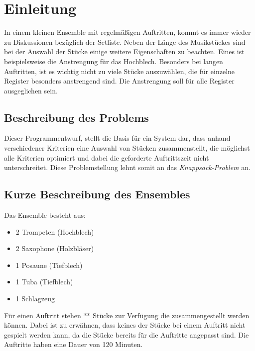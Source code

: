 \section{Einleitung}\label{sec:einleitung}
In einem kleinen Ensemble mit regelmäßigen Auftritten, kommt es immer wieder zu Diskussionen 
bezüglich der Setliste. Neben der Länge des Musikstückes sind bei der Auswahl der Stücke einige 
weitere Eigenschaften zu beachten. Eines ist beispielsweise die Anstrengung für das Hochblech. 
Besonders bei langen Auftritten, ist es wichtig nicht zu viele Stücke auszuwählen, die 
für einzelne Register besonders anstrengend sind. Die Anstrengung soll für alle Register ausgeglichen sein.
\subsection{Beschreibung des Problems}
 Dieser Programmentwurf, stellt die Basis für ein System dar, dass anhand verschiedener Kriterien eine 
 Auswahl von Stücken zusammenstellt, die möglichst alle Kriterien optimiert und dabei die 
 geforderte Auftrittszeit nicht unterschreitet. Diese Problemstellung lehnt somit an das \textit{Knappsack-Problem} an.
\subsection{Kurze Beschreibung des Ensembles}
Das Ensemble besteht aus: 
\begin{itemize}
    \item 2 Trompeten (Hochblech)
    \item 2 Saxophone (Holzbläser)
    \item 1 Posaune (Tiefblech)
    \item 1 Tuba (Tiefblech)
    \item 1 Schlagzeug 
\end{itemize} 

Für einen Auftritt stehen ** Stücke zur Verfügung die zusammengestellt werden können. Dabei ist zu erwähnen, dass keines
der Stücke bei einem Auftritt nicht gespielt werden kann, da die Stücke bereits für die Auftritte angepasst sind.
Die Auftritte haben eine Dauer von 120 Minuten.